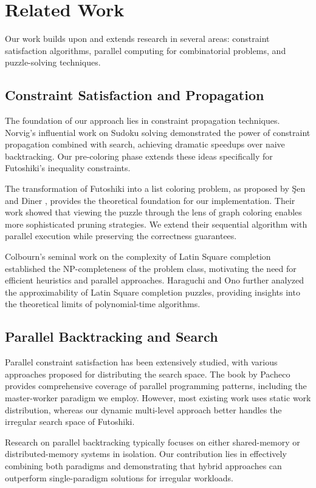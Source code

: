 \section{Related Work}
Our work builds upon and extends research in several areas: constraint satisfaction algorithms, parallel computing for combinatorial problems, and puzzle-solving techniques.

\subsection{Constraint Satisfaction and Propagation}
The foundation of our approach lies in constraint propagation techniques. Norvig's influential work on Sudoku solving \cite{NorvigSudoku} demonstrated the power of constraint propagation combined with search, achieving dramatic speedups over naive backtracking. Our pre-coloring phase extends these ideas specifically for Futoshiki's inequality constraints.

The transformation of Futoshiki into a list coloring problem, as proposed by Şen and Diner \cite{Sen2024Futoshiki}, provides the theoretical foundation for our implementation. Their work showed that viewing the puzzle through the lens of graph coloring enables more sophisticated pruning strategies. We extend their sequential algorithm with parallel execution while preserving the correctness guarantees.

Colbourn's seminal work \cite{Colbourn1984} on the complexity of Latin Square completion established the NP-completeness of the problem class, motivating the need for efficient heuristics and parallel approaches. Haraguchi and Ono \cite{Haraguchi2014} further analyzed the approximability of Latin Square completion puzzles, providing insights into the theoretical limits of polynomial-time algorithms.

\subsection{Parallel Backtracking and Search}
Parallel constraint satisfaction has been extensively studied, with various approaches proposed for distributing the search space. The book by Pacheco \cite{Pacheco2011} provides comprehensive coverage of parallel programming patterns, including the master-worker paradigm we employ. However, most existing work uses static work distribution, whereas our dynamic multi-level approach better handles the irregular search space of Futoshiki.

Research on parallel backtracking typically focuses on either shared-memory or distributed-memory systems in isolation. Our contribution lies in effectively combining both paradigms and demonstrating that hybrid approaches can outperform single-paradigm solutions for irregular workloads.


